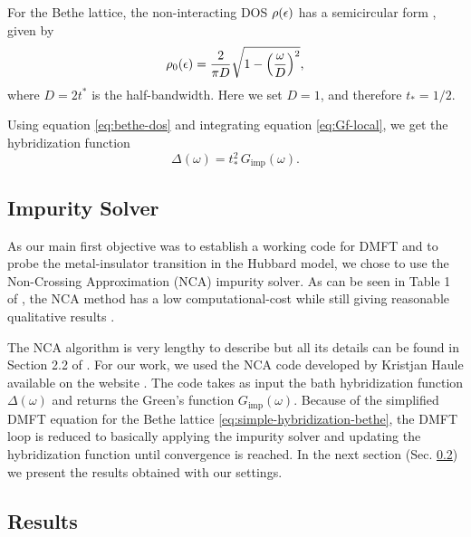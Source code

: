 \documentclass[12pt]{report}
\begin{document}
For the Bethe lattice, the non-interacting DOS $\rho(\epsilon)$ has a semicircular form \cite{georges1996}, given by
\begin{equation} \label{eq:bethe-dos}
\rho_0(\epsilon) = \frac{2}{\pi D} \sqrt{1-\qty(\frac{\omega}{D})^2},
\end{equation}
where $D = 2t^*$ is the half-bandwidth. Here we set $D = 1$, and therefore $t_* = 1/2$.


Using equation \ref{eq:bethe-dos} and integrating equation \ref{eq:Gf-local}, we get the hybridization function \cite{thesis_bruno}
\begin{equation} \label{eq:simple-hybridization-bethe}
\Delta(\omega) = t_*^2 \, G_{\text{imp}}(\omega).
\end{equation}

\subsection{Impurity Solver} \label{sec:impurity-solver}

As our main first objective was to establish a working code for DMFT and to probe the metal-insulator transition in the Hubbard model, we chose to use the Non-Crossing Approximation (NCA) impurity solver. As can be seen in Table 1 of \cite{impurity-solvers}, the NCA method has a low computational-cost while still giving reasonable qualitative results \cite{haule_real_materials, vildosola2015}.

The NCA algorithm is very lengthy to describe but all its details can be found in Section 2.2 of \cite{thesis_bruno}. For our work, we used the NCA code developed by Kristjan Haule available on the website \cite{hauleweb}. The code takes as input the bath hybridization function $\Delta(\omega)$ and returns the Green's function $G_{\text{imp}}(\omega)$. Because of the simplified DMFT equation for the Bethe lattice \ref{eq:simple-hybridization-bethe}, the DMFT loop is reduced to basically applying the impurity solver and updating the hybridization function until convergence is reached. In the next section (Sec. \ref{sec:results}) we present the results obtained with our settings.

\subsection{Results} \label{sec:results}
\end{document}
